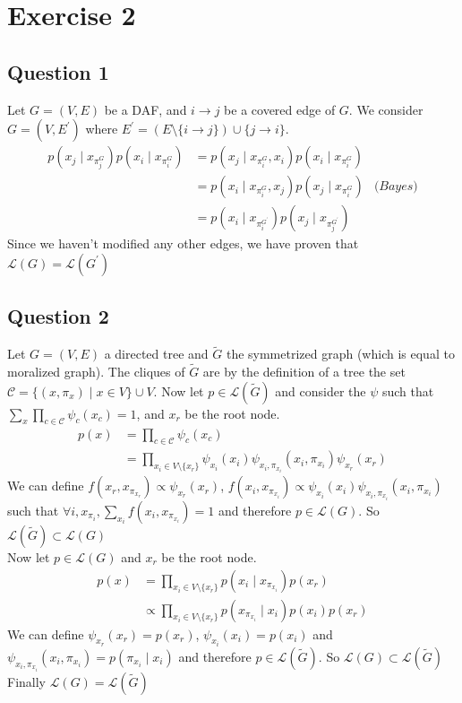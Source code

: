 \documentclass[a4paper]{article}
\begin{document}
\section{Exercise 2}
\subsection{Question 1}
Let $G = (V,E)$ be a DAF, and $i\rightarrow j$ be a covered edge of $G$. We consider $G = (V,E^\prime)$ where $E^\prime = (E \setminus \{i \rightarrow j \}) \cup \{j \rightarrow i \}$.
\begin{align*}
p(x_j \mid x_{\pi_j^G})p(x_i \mid x_{\pi_i^G}) &= p(x_j \mid x_{\pi_i^G}, x_i)p(x_i \mid x_{\pi_i^G}) \\
&= p(x_i \mid x_{\pi_i^G}, x_j)p(x_j \mid x_{\pi_i^G}) &\textit{(Bayes)} \\
&= p(x_i \mid x_{\pi_i^{G^\prime}})p(x_j \mid x_{\pi_j^{G^\prime}})
\end{align*}
Since we haven't modified any other edges, we have proven that $\mathcal{L}(G) = \mathcal{L}(G^\prime)$
\subsection{Question 2}
Let $G=(V,E)$ a directed tree and $\tilde{G}$ the symmetrized graph (which is equal to moralized graph). The cliques of $\tilde{G}$ are by the definition of a tree the set $\mathcal{C} = \{ (x,\pi_x) \mid x \in V\} \cup V$. Now let $p \in \mathcal{L}(\tilde{G})$ and consider the $\psi$ such that $\sum_{x} \prod_{c\in \mathcal{C}} \psi_c(x_c) = 1$, and $x_r$ be the root node.
\begin{align*}
p(x) &= \prod_{c \in \mathcal{C}}\psi_c(x_c) \\
&= \prod_{x_i \in V \setminus \{x_r\}} \psi_{x_i}(x_i)\psi_{x_i, \pi_{x_i}}(x_i,\pi_{x_i}) \psi_{x_r}(x_r)
\end{align*}
We can define $f(x_r,x_{\pi_{x_r}}) \propto \psi_{x_r}(x_r)$, $f(x_i,x_{\pi_{x_i}}) \propto \psi_{x_i}(x_i)\psi_{x_i, \pi_{x_i}}(x_i,\pi_{x_i})$ such that $ \forall i, x_{\pi_i}, \sum_{x_i} f(x_i, x_{\pi_{x_i}}) = 1 $ and therefore $p \in \mathcal{L}(G)$. So $\mathcal{L}(\tilde{G}) \subset \mathcal{L}(G)$ \\
Now let $p \in \mathcal{L}(G)$ and $x_r$ be the root node.
\begin{align*}
p(x) &= \prod_{x_i \in V \setminus \{x_r\}} p(x_i \mid x_{\pi_{x_i}}) p(x_r) \\
&\propto \prod_{x_i \in V \setminus \{x_r\}} p(x_{\pi_{x_i}} \mid x_i) p(x_i) p(x_r)
\end{align*}
We can define $\psi_{x_r}(x_r) = p(x_r)$, $\psi_{x_i}(x_i) = p(x_i)$ and $\psi_{x_i,\pi_{x_i}}(x_i,\pi_{x_i}) = p(\pi_{x_i} \mid x_i)$ and therefore $p \in \mathcal{L}(\tilde{G})$. So $\mathcal{L}(G) \subset \mathcal{L}(\tilde{G})$ \\
Finally $\mathcal{L}(G) = \mathcal{L}(\tilde{G})$
\newpage
\end{document}
